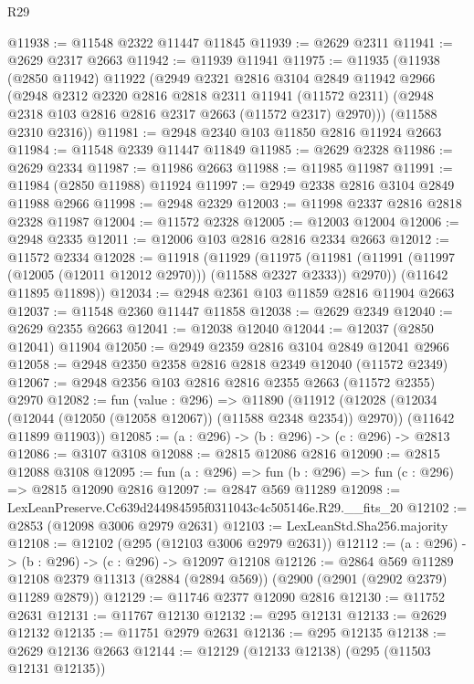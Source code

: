 \begin{lexlean}{R29}
\begin{coremodule}
@11938 := @11548 @2322 @11447 @11845
@11939 := @2629 @2311
@11941 := @2629 @2317 @2663
@11942 := @11939 @11941
@11975 := @11935
    (@11938
      (@2850 @11942)
      @11922
      (@2949
        @2321
        @2816
        @3104
        @2849
        @11942
        @2966
        (@2948
          @2312
          @2320
          @2816
          @2818
          @2311
          @11941
          (@11572 @2311)
          (@2948 @2318 @103 @2816 @2816 @2317 @2663 (@11572 @2317) @2970)))
      (@11588 @2310 @2316))
@11981 := @2948 @2340 @103 @11850 @2816 @11924 @2663
@11984 := @11548 @2339 @11447 @11849
@11985 := @2629 @2328
@11986 := @2629 @2334
@11987 := @11986 @2663
@11988 := @11985 @11987
@11991 := @11984 (@2850 @11988) @11924
@11997 := @2949 @2338 @2816 @3104 @2849 @11988 @2966
@11998 := @2948 @2329
@12003 := @11998 @2337 @2816 @2818 @2328 @11987
@12004 := @11572 @2328
@12005 := @12003 @12004
@12006 := @2948 @2335
@12011 := @12006 @103 @2816 @2816 @2334 @2663
@12012 := @11572 @2334
@12028 := @11918
    (@11929
      (@11975 (@11981 (@11991 (@11997 (@12005 (@12011 @12012 @2970))) (@11588 @2327 @2333)) @2970))
      (@11642 @11895 @11898))
@12034 := @2948 @2361 @103 @11859 @2816 @11904 @2663
@12037 := @11548 @2360 @11447 @11858
@12038 := @2629 @2349
@12040 := @2629 @2355 @2663
@12041 := @12038 @12040
@12044 := @12037 (@2850 @12041) @11904
@12050 := @2949 @2359 @2816 @3104 @2849 @12041 @2966
@12058 := @2948 @2350 @2358 @2816 @2818 @2349 @12040 (@11572 @2349)
@12067 := @2948 @2356 @103 @2816 @2816 @2355 @2663 (@11572 @2355) @2970
@12082 := fun (value : @296) =>
  @11890
    (@11912
      (@12028 (@12034 (@12044 (@12050 (@12058 @12067)) (@11588 @2348 @2354)) @2970))
      (@11642 @11899 @11903))
@12085 := (a : @296) -> (b : @296) -> (c : @296) -> @2813
@12086 := @3107 @3108
@12088 := @2815 @12086 @2816
@12090 := @2815 @12088 @3108
@12095 := fun (a : @296) => fun (b : @296) => fun (c : @296) => @2815 @12090 @2816
@12097 := @2847 @569 @11289
@12098 := LexLeanPreserve.Cc639d244984595f0311043c4c505146e.R29.__fits_20
@12102 := @2853 (@12098 @3006 @2979 @2631)
@12103 := LexLeanStd.Sha256.majority
@12108 := @12102 (@295 (@12103 @3006 @2979 @2631))
@12112 := (a : @296) -> (b : @296) -> (c : @296) -> @12097 @12108
@12126 := @2864
    @569
    @11289
    @12108
    @2379
    @11313
    (@2884 (@2894 @569))
    (@2900 (@2901 (@2902 @2379) @11289 @2879))
@12129 := @11746 @2377 @12090 @2816
@12130 := @11752 @2631
@12131 := @11767 @12130
@12132 := @295 @12131
@12133 := @2629 @12132
@12135 := @11751 @2979 @2631
@12136 := @295 @12135
@12138 := @2629 @12136 @2663
@12144 := @12129 (@12133 @12138) (@295 (@11503 @12131 @12135))

\end{coremodule}
\end{lexlean}
